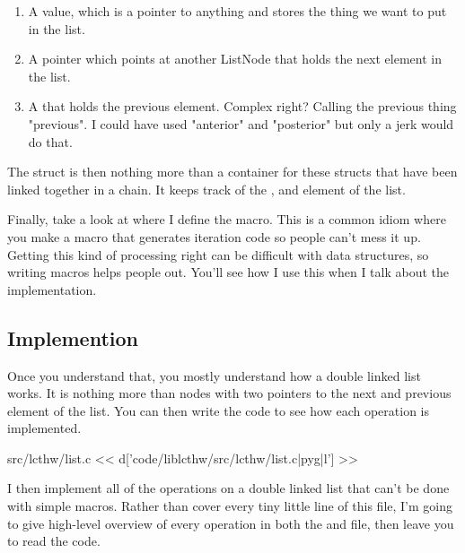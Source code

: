 \begin{enumerate}
\item A value, which is a pointer to anything and stores the thing we want
    to put in the list.
\item A  pointer which points at another ListNode 
    that holds the next element in the list.
\item A  that holds the previous element.  Complex
    right?  Calling the previous thing "previous".  I could have used
    "anterior" and "posterior" but only a jerk would do that.
\end{enumerate}

The  struct is then nothing more than a container for these
 structs that have been linked together in a chain.
It keeps track of the ,  and 
element of the list.

Finally, take a look at  where I define
the  macro.  This is a common idiom where you
make a macro that generates iteration code so people can't mess
it up.  Getting this kind of processing right can be difficult with
data structures, so writing macros helps people out.  You'll see
how I use this when I talk about the implementation.

\subsection{Implemention}

Once you understand that, you mostly understand how a double linked list
works.  It is nothing more than nodes with two pointers to the next and
previous element of the list.  You can then write the 
code to see how each operation is implemented.

\begin{code}{src/lcthw/list.c}
<< d['code/liblcthw/src/lcthw/list.c|pyg|l'] >>
\end{code}

I then implement all of the operations on a double linked list that can't
be done with simple macros.  Rather than cover every tiny little line of
this file, I'm going to give high-level overview of every operation
in both the  and  file, then leave you to read
the code.

